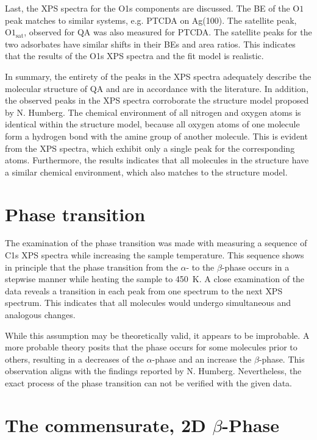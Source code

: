 Last, the \ac{XPS} spectra for the O1s components are discussed. The \ac{BE} of the $\mathrm{O1}$ peak matches to similar systems, e.g. \ac{PTCDA} on Ag(100).\autocite{Bauer2014} The satellite peak, $\mathrm{O1_{sat}}$, observed for \ac{QA} was also measured for \ac{PTCDA}. The satellite peaks for the two adsorbates have similar shifts in their \acp{BE} and area ratios. This indicates that the results of the O1s \ac{XPS} spectra and the fit model is realistic.

In summary, the entirety of the peaks in the \ac{XPS} spectra adequately describe the molecular structure of \ac{QA} and are in accordance with the literature. In addition, the observed peaks in the \ac{XPS} spectra corroborate the structure model proposed by N. Humberg.\autocite{Humberg2024} The chemical environment of all nitrogen and oxygen atoms is identical within the structure model, because all oxygen atoms of one molecule form a hydrogen bond with the amine group of another molecule. This is evident from the \ac{XPS} spectra, which exhibit only a single peak for the corresponding atoms. Furthermore, the results indicates that all molecules in the structure have a similar chemical environment, which also matches to the structure model.

\section{Phase transition}

The examination of the phase transition was made with measuring a sequence of C1s \ac{XPS} spectra while increasing the sample temperature. This sequence shows in principle that the phase transition from the $\alpha$- to the $\beta$-phase occurs in a stepwise manner while heating the sample to 450~\si{K}. A close examination of the data reveals a transition in each peak from one spectrum to the next \ac{XPS} spectrum. This indicates that all molecules would undergo simultaneous and analogous changes.

While this assumption may be theoretically valid, it appears to be improbable. A more probable theory posits that the phase occurs for some molecules prior to others, resulting in a decreases of the $\alpha$-phase and an increase the $\beta$-phase. This observation aligns with the findings reported by N. Humberg.\autocite{Humberg2024} Nevertheless, the exact process of the phase transition can not be verified with the given data.

\section{The commensurate, 2D \texorpdfstring{$\beta$}{beta}-Phase}

